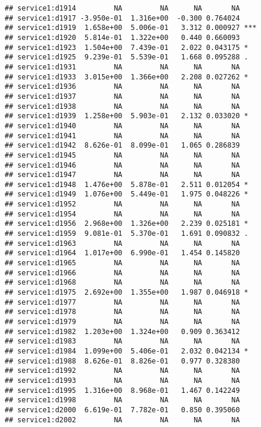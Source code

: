 \documentclass[
]{article}
\begin{document}
\begin{verbatim}
## service1:d1914         NA         NA      NA       NA    
## service1:d1917 -3.950e-01  1.316e+00  -0.300 0.764024    
## service1:d1919  1.658e+00  5.006e-01   3.312 0.000927 ***
## service1:d1920  5.814e-01  1.322e+00   0.440 0.660093    
## service1:d1923  1.504e+00  7.439e-01   2.022 0.043175 *  
## service1:d1925  9.239e-01  5.539e-01   1.668 0.095288 .  
## service1:d1931         NA         NA      NA       NA    
## service1:d1933  3.015e+00  1.366e+00   2.208 0.027262 *  
## service1:d1936         NA         NA      NA       NA    
## service1:d1937         NA         NA      NA       NA    
## service1:d1938         NA         NA      NA       NA    
## service1:d1939  1.258e+00  5.903e-01   2.132 0.033020 *  
## service1:d1940         NA         NA      NA       NA    
## service1:d1941         NA         NA      NA       NA    
## service1:d1942  8.626e-01  8.099e-01   1.065 0.286839    
## service1:d1945         NA         NA      NA       NA    
## service1:d1946         NA         NA      NA       NA    
## service1:d1947         NA         NA      NA       NA    
## service1:d1948  1.476e+00  5.878e-01   2.511 0.012054 *  
## service1:d1949  1.076e+00  5.449e-01   1.975 0.048226 *  
## service1:d1952         NA         NA      NA       NA    
## service1:d1954         NA         NA      NA       NA    
## service1:d1956  2.968e+00  1.326e+00   2.239 0.025181 *  
## service1:d1959  9.081e-01  5.370e-01   1.691 0.090832 .  
## service1:d1963         NA         NA      NA       NA    
## service1:d1964  1.017e+00  6.990e-01   1.454 0.145820    
## service1:d1965         NA         NA      NA       NA    
## service1:d1966         NA         NA      NA       NA    
## service1:d1968         NA         NA      NA       NA    
## service1:d1975  2.692e+00  1.355e+00   1.987 0.046918 *  
## service1:d1977         NA         NA      NA       NA    
## service1:d1978         NA         NA      NA       NA    
## service1:d1979         NA         NA      NA       NA    
## service1:d1982  1.203e+00  1.324e+00   0.909 0.363412    
## service1:d1983         NA         NA      NA       NA    
## service1:d1984  1.099e+00  5.406e-01   2.032 0.042134 *  
## service1:d1988  8.626e-01  8.826e-01   0.977 0.328380    
## service1:d1992         NA         NA      NA       NA    
## service1:d1993         NA         NA      NA       NA    
## service1:d1995  1.316e+00  8.968e-01   1.467 0.142249    
## service1:d1998         NA         NA      NA       NA    
## service1:d2000  6.619e-01  7.782e-01   0.850 0.395060    
## service1:d2002         NA         NA      NA       NA    

\end{verbatim}
\end{document}
